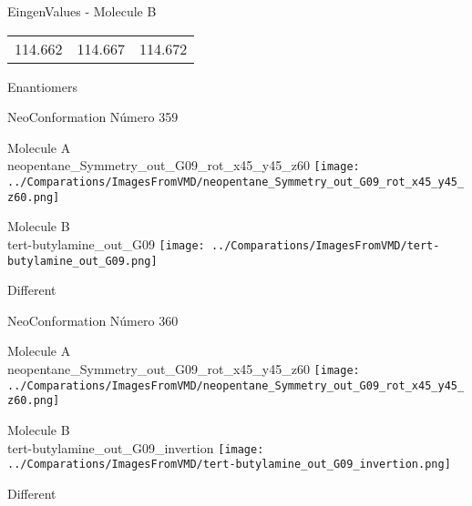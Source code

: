 \begin{multicols}{2}
\begin{center}
\vtab
 EingenValues - Molecule B     \\
\vtab
\begin{tabular}{|c c c|}
114.662	 & 	114.667	 & 	114.672	 \\
\end{tabular}

\end{center}
\end{multicols}
\begin{center}
\vtab
\vtab
\textcolor{NavyBlue}{\Large Enantiomers}
\end{center}

 \newpage

\vtab[-2cm]
\begin{center}
{\large NeoConformation \tab Número 359}
\end{center}
\begin{multicols}{2}
\begin{center}
Molecule A \\ 
neopentane\_Symmetry\_out\_G09\_rot\_x45\_y45\_z60
\texttt{[image: ../Comparations/ImagesFromVMD/neopentane\_Symmetry\_out\_G09\_rot\_x45\_y45\_z60.png]}
\\
\vtab

\columnbreak
Molecule B \\ 
tert-butylamine\_out\_G09
\texttt{[image: ../Comparations/ImagesFromVMD/tert-butylamine\_out\_G09.png]}
\\
\vtab


\end{center}
\end{multicols}
\begin{center}
\vtab
\vtab
\textcolor{NavyBlue}{\Large Different}
\end{center}

 \newpage

\vtab[-2cm]
\begin{center}
{\large NeoConformation \tab Número 360}
\end{center}
\begin{multicols}{2}
\begin{center}
Molecule A \\ 
neopentane\_Symmetry\_out\_G09\_rot\_x45\_y45\_z60
\texttt{[image: ../Comparations/ImagesFromVMD/neopentane\_Symmetry\_out\_G09\_rot\_x45\_y45\_z60.png]}
\\
\vtab

\columnbreak
Molecule B \\ 
tert-butylamine\_out\_G09\_invertion
\texttt{[image: ../Comparations/ImagesFromVMD/tert-butylamine\_out\_G09\_invertion.png]}
\\
\vtab


\end{center}
\end{multicols}
\begin{center}
\vtab
\vtab
\textcolor{NavyBlue}{\Large Different}
\end{center}

